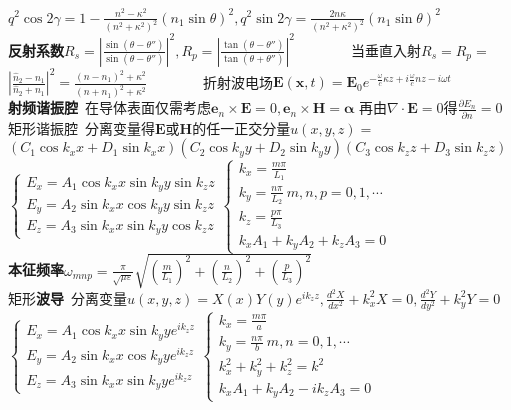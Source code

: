 \documentclass[10pt,a4paper]{article}
\begin{document}
\begin{multicols}{2}
\indent{}$q^2\cos2\gamma=1-\frac{n^2-\kappa^2}{(n^2+\kappa^2)^2}(n_1\sin\theta)^2,q^2\sin2\gamma=\frac{2n\kappa}{(n^2+\kappa^2)^2}(n_1\sin\theta)^2$\\
\textbf{反射系数}$R_s=|\frac{\sin(\theta-\theta'')}{\sin(\theta-\theta'')}|^2,R_p=|\frac{\tan(\theta-\theta'')}{\tan(\theta+\theta'')}|^2$~~~~~~~~当垂直入射$R_s=R_p=$\\
\indent$|\frac{\hat{n}_2-n_1}{\hat{n}_2+n_1}|^2=\frac{(n-n_1)^2+\kappa^2}{(n+n_1)^2+\kappa^2}$~~~~~~~~折射波电场$\bm{E}(\bm{x},t)=\bm{E}_0e^{-\frac{\omega}{c}\kappa z+i\frac{\omega}{c}nz-i\omega t}$\\
\textbf{射频谐振腔}~在导体表面仅需考虑$\bm{e}_n\times\bm{E}=0,\bm{e}_n\times\bm{H}=\bm{\alpha}$ 再由$\nabla\cdot\bm{E}=0$得$\frac{\partial E_n}{\partial n}=0$\\
矩形谐振腔~分离变量得$\bm{E}$或$\bm{H}$的任一正交分量$u(x,y,z)=$\\
\indent$(C_1\cos k_xx+D_1\sin k_xx)(C_2\cos k_yy+D_2\sin k_yy)(C_3\cos k_zz+D_3\sin k_zz)$\\
\indent{}\scriptsize$\left\{\begin{array}{l}E_x=A_1\cos k_xx\sin k_yy\sin k_zz\\E_y=A_2\sin k_xx\cos k_yy\sin k_zz\\E_z=A_3\sin k_xx\sin k_yy\cos k_zz\end{array}\right.$\scriptsize$\left\{\begin{array}{l}k_x=\frac{m\pi}{L_1}\\k_y=\frac{n\pi}{L_2}~m,n,p=0,1,\cdots\\k_z=\frac{p\pi}{L_3}\\k_xA_1+k_yA_2+k_zA_3=0\end{array}\right.$\\
\indent\textbf{本征频率}$\omega_{mnp}=\frac{\pi}{\sqrt{\mu\varepsilon}}\sqrt{(\frac{m}{L_1})^2+(\frac{n}{L_2})^2+(\frac{p}{L_3})^2}$\\
矩形\textbf{波导}~分离变量$u(x,y,z)=X(x)Y(y)e^{ik_zz},\frac{d^2X}{dx^2}+k_x^2X=0,\frac{d^2Y}{dy^2}+k_y^2Y=0$\\
\indent{}\scriptsize$\left\{\begin{array}{l}E_x=A_1\cos k_xx\sin k_yye^{ik_zz}\\E_y=A_2\sin k_xx\cos k_yye^{ik_zz}\\E_z=A_3\sin k_xx\sin k_yye^{ik_zz}\end{array}\right.$\scriptsize$\left\{\begin{array}{l}k_x=\frac{m\pi}{a}\\k_y=\frac{n\pi}{b}~m,n=0,1,\cdots\\k_x^2+k_y^2+k_z^2=k^2\\k_xA_1+k_yA_2-ik_zA_3=0\end{array}\right.$\\

\end{multicols}
\end{document}
